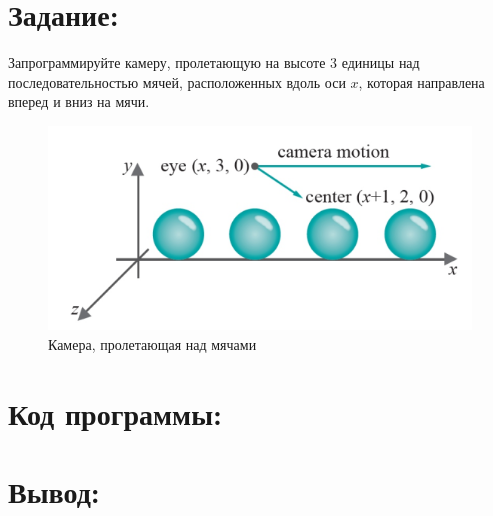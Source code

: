 \documentclass{bmstu}
\begin{document}
	\section*{Задание:}
	
	Запрограммируйте камеру, пролетающую на высоте 3 единицы над последовательностью мячей, расположенных вдоль оси $x$, которая направлена вперед и вниз на мячи.
	
	\begin{figure}[H]
		\centering
		\includegraphics[width=0.8\linewidth]{graphics/camera}
		\caption{Камера, пролетающая над мячами}
		\label{fig:camera}
	\end{figure}
	
	
	\section*{Код программы:}
	
	\section*{Вывод:}
	
	
\end{document}

